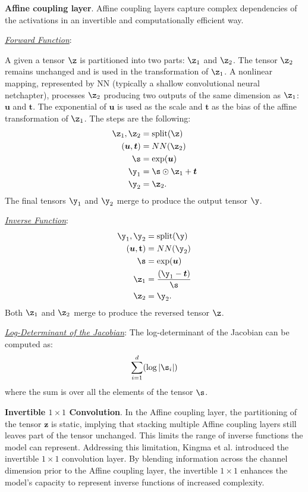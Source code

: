 \medskip

\textbf{Affine coupling layer}. Affine coupling layers \cite{Nice2014} capture complex dependencies of the activations in an invertible and computationally efficient way.

\smallskip

\textit{\underline{Forward Function}}:

A given a tensor \(\z\) is partitioned into two parts: \(\z_1\) and \(\z_2\). The tensor \(\z_2\) remains unchanged and is used in the transformation of \(\z_1\). A nonlinear mapping, represented by NN (typically a shallow convolutional neural netchapter), processes \(\z_2\) producing two outputs of the same dimension as \(\z_1\): \(\boldsymbol{u}\) and \(\boldsymbol{t}\). The exponential of \(\boldsymbol{u}\) is used as the scale and $\boldsymbol{t}$ as the bias of the affine transformation of \(\z_1\). The steps are the following:
\begin{align*}
\z_1, \z_2 &= \text{split}(\z) \\
(\boldsymbol{u},\boldsymbol{t}) &= NN(\z_2) \\
\s &= \exp(\boldsymbol{u}) \\
\y_1 &= \s \odot \z_1 + \boldsymbol{t} \\
\y_2 &= \z_2.
\end{align*}
The final tensors \(\y_1\) and \(\y_2\) merge to produce the output tensor \(\y\).

\smallskip

\textit{\underline{Inverse Function}}:
\begin{align*}
\y_1, \y_2 &= \text{split}(\y) \\
(\boldsymbol{u},\textbf{t}) &= NN(\y_2) \\
\s &= \exp(\boldsymbol{u}) \\
\z_1 &= \frac{(\y_1 - \boldsymbol{t})}{\s} \\
\z_2 &= \y_2.
\end{align*}
Both \(\z_1\) and \(\z_2\) merge to produce the reversed tensor \(\z\).

\smallskip

\textit{\underline{Log-Determinant of the Jacobian}}: The log-determinant of the Jacobian can be computed as:
\[\sum_{i=1}^{d}(\log |\s_i|)
\]where the sum is over all the elements of the tensor $\s$.

\smallskip

\textbf{Invertible \(1 \times 1\) Convolution}.
In the Affine coupling layer, the partitioning of the tensor \(\textbf{z}\) is static, implying that stacking multiple Affine coupling layers still leaves part of the tensor unchanged. This limits the range of inverse functions the model can represent. Addressing this limitation, Kingma et al. \cite{GLOW} introduced the invertible \(1 \times 1\) convolution layer. By blending information across the channel dimension prior to the Affine coupling layer, the invertible \(1 \times 1\) enhances the model's capacity to represent inverse functions of increased complexity.

